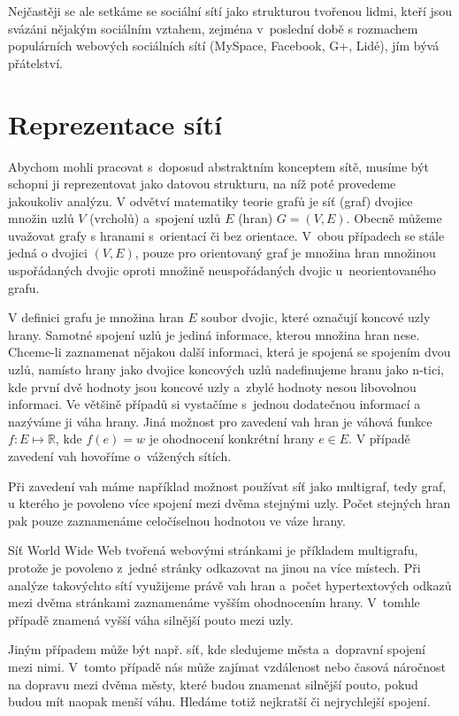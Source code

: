 \documentclass{bakalarka}
\begin{document}
Nejčastěji se ale setkáme se sociální sítí jako strukturou tvořenou lidmi,
kteří jsou svázáni nějakým sociálním vztahem, zejména v~poslední době s
rozmachem populárních webových sociálních sítí (MySpace, Facebook, G+, Lidé),
jím bývá přátelství.

\section{Reprezentace sítí}
Abychom mohli pracovat s~doposud abstraktním konceptem sítě, musíme být schopni
ji reprezentovat jako datovou strukturu, na níž poté provedeme jakoukoliv
analýzu.
V odvětví matematiky teorie grafů je síť (graf) dvojice množin uzlů $V$
(vrcholů) a~spojení uzlů $E$ (hran) $G = (V, E)$.  Obecně můžeme uvažovat grafy
s hranami s~orientací či bez orientace. V~obou případech se stále jedná o
dvojici $(V, E)$, pouze pro orientovaný graf je množina hran množinou
uspořádaných dvojic oproti množině neuspořádaných dvojic u~neorientovaného
grafu.

V definici grafu je množina hran $E$ soubor dvojic, které označují koncové uzly
hrany. Samotné spojení uzlů je jediná informace, kterou množina hran nese.
Chceme-li zaznamenat nějakou další informaci, která je spojená se spojením dvou
uzlů, namísto hrany jako dvojice koncových uzlů nadefinujeme hranu jako n-tici,
kde první dvě hodnoty jsou koncové uzly a~zbylé hodnoty nesou libovolnou
informaci.  Ve většině případů si vystačíme s~jednou dodatečnou informací a
nazýváme ji váha hrany. Jiná možnost pro zavedení vah hran je váhová funkce $f:
E \mapsto \mathbb{R}$, kde $f(e) = w$ je ohodnocení konkrétní hrany $e \in E$.
V případě zavedení vah hovoříme o~vážených sítích.

Při zavedení vah máme například možnost používat síť jako multigraf, tedy graf,
u kterého je povoleno více spojení mezi dvěma stejnými uzly. Počet stejných
hran pak pouze zaznamenáme celočíselnou hodnotou ve váze hrany.

Síť World Wide Web tvořená webovými stránkami je příkladem
multigrafu, protože je povoleno z~jedné stránky odkazovat na jinou na více
místech. Při analýze takovýchto sítí využijeme právě vah hran a~počet
hypertextových odkazů mezi dvěma stránkami zaznamenáme vyšším ohodnocením
hrany. V~tomhle případě znamená vyšší váha silnější pouto mezi uzly.

Jiným případem může být např. síť, kde sledujeme města a~dopravní spojení
mezi nimi. V~tomto případě nás může zajímat vzdálenost nebo časová náročnost
na dopravu mezi dvěma městy, které budou znamenat silnější pouto, pokud budou
mít naopak menší váhu. Hledáme totiž nejkratší či nejrychlejší spojení.
\end{document}

